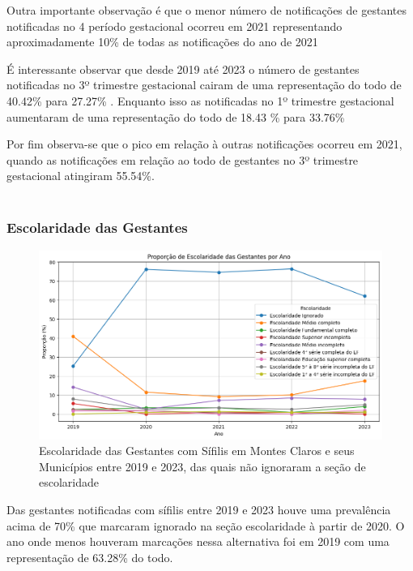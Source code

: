 \documentclass[a4paper]{article}
\begin{document}
\begin{multicols}
Outra importante observação é que o menor número de notificações de gestantes notificadas no 4 período gestacional ocorreu em 2021 representando aproximadamente 10\% de todas as notificações do ano de 2021

É interessante observar que desde 2019 até 2023 o número de gestantes notificadas no 3º trimestre gestacional cairam de uma representação do todo de 40.42\% para 27.27\% . Enquanto isso as notificadas no 1º trimestre gestacional aumentaram de uma representação do todo de 18.43 \% para 33.76\%

Por fim observa-se que o pico em relação à outras notificações ocorreu em 2021, quando as notificações em relação ao todo de gestantes no 3º trimestre gestacional atingiram 55.54\%.
\\
\\
\subsubsection{Escolaridade das Gestantes}
\begin{figure}[h!]
    \centering
    \includegraphics[width=0.7\linewidth]{imagens/Escolaridade.png}
    \caption{Escolaridade das Gestantes com Sífilis em Montes Claros e seus Municípios entre 2019 e 2023, das quais não ignoraram a seção de escolaridade}
    \label{fig:enter-label}
\end{figure}
 Das gestantes notificadas com sífilis entre 2019 e 2023 houve uma prevalência acima de 70\% que marcaram ignorado na seção escolaridade à partir de 2020. O ano onde menos houveram marcações nessa alternativa foi em 2019 com uma representação de 63.28\% do todo.


\end{multicols}
\end{document}
